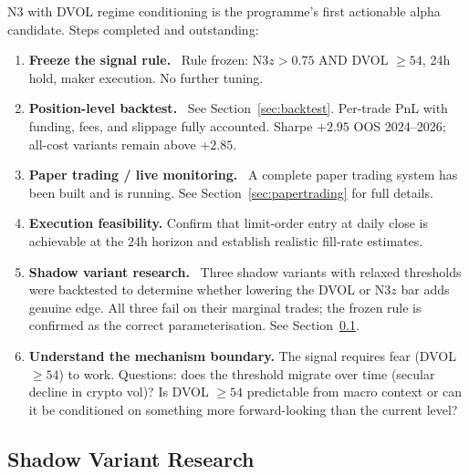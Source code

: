 \documentclass[12pt, a4paper]{article}
\theoremstyle{definition}
\begin{document}
N3 with DVOL regime conditioning is the programme's first actionable alpha
candidate.  Steps completed and outstanding:

\begin{enumerate}
  \item \textbf{Freeze the signal rule.} \checkmark\
        Rule frozen: N3$z > 0.75$ AND DVOL $\geq 54$, 24h hold, maker execution.
        No further tuning.

  \item \textbf{Position-level backtest.} \checkmark\
        See Section~\ref{sec:backtest}.  Per-trade PnL with funding, fees,
        and slippage fully accounted.  Sharpe $+2.95$ OOS 2024--2026;
        all-cost variants remain above $+2.85$.

  \item \textbf{Paper trading / live monitoring.} \checkmark\
        A complete paper trading system has been built and is running.
        See Section~\ref{sec:papertrading} for full details.

  \item \textbf{Execution feasibility.}
        Confirm that limit-order entry at daily close is achievable at the
        24h horizon and establish realistic fill-rate estimates.

  \item \textbf{Shadow variant research.} \checkmark\
        Three shadow variants with relaxed thresholds were backtested to
        determine whether lowering the DVOL or N3$z$ bar adds genuine edge.
        All three fail on their marginal trades; the frozen rule is confirmed
        as the correct parameterisation.  See
        Section~\ref{sec:shadow}.

  \item \textbf{Understand the mechanism boundary.}
        The signal requires fear (DVOL $\geq 54$) to work.  Questions:
        does the threshold migrate over time (secular decline in crypto vol)?
        Is DVOL $\geq 54$ predictable from macro context or can it be
        conditioned on something more forward-looking than the current level?
\end{enumerate}

\subsection{Shadow Variant Research}
\label{sec:shadow}
\end{document}
